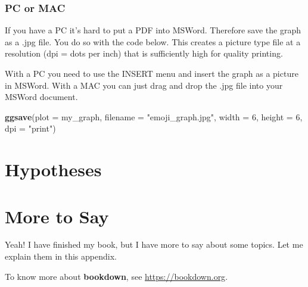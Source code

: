 \documentclass[
]{krantz}
\makeatletter
\newenvironment{Shaded}{\begin{snugshade}}{\end{snugshade}}
\newcommand{\DataTypeTok}[1]{\textcolor[rgb]{0.27,0.27,0.27}{#1}}
\newcommand{\DecValTok}[1]{\textcolor[rgb]{0.06,0.06,0.06}{#1}}
\newcommand{\KeywordTok}[1]{\textcolor[rgb]{0.27,0.27,0.27}{\textbf{#1}}}
\newcommand{\NormalTok}[1]{#1}
\newcommand{\StringTok}[1]{\textcolor[rgb]{0.5,0.5,0.5}{#1}}
\newenvironment{kframe}{%
\medskip{}
\setlength{\fboxsep}{.8em}
 \def\at@end@of@kframe{}%
 \ifinner\ifhmode%
  \def\at@end@of@kframe{\end{minipage}}%
  \begin{minipage}{\columnwidth}%
 \fi\fi%
 \def\FrameCommand##1{\hskip\@totalleftmargin \hskip-\fboxsep
 \colorbox{shadecolor}{##1}\hskip-\fboxsep
     \hskip-\linewidth \hskip-\@totalleftmargin \hskip\columnwidth}%
 \MakeFramed {\advance\hsize-\width
   \@totalleftmargin\z@ \linewidth\hsize
   \@setminipage}}%
 {\par\unskip\endMakeFramed%
 \at@end@of@kframe}
\renewenvironment{Shaded}{\begin{kframe}}{\end{kframe}}
\makeatother
\begin{document}
\hypertarget{pc-or-mac}{%
\subsection{PC or MAC}\label{pc-or-mac}}

If you have a PC it's hard to put a PDF into MSWord. Therefore save the graph as a .jpg file. You do so with the code below. This creates a picture type file at a resolution (dpi = dots per inch) that is sufficiently high for quality printing.

With a PC you need to use the INSERT menu and insert the graph as a picture in MSWord. With a MAC you can just drag and drop the .jpg file into your MSWord document.

\begin{Shaded}
\begin{Highlighting}[]
\KeywordTok{ggsave}\NormalTok{(}\DataTypeTok{plot =}\NormalTok{ my_graph, }
       \DataTypeTok{filename =} \StringTok{"emoji_graph.jpg"}\NormalTok{, }
       \DataTypeTok{width =} \DecValTok{6}\NormalTok{, }
       \DataTypeTok{height =} \DecValTok{6}\NormalTok{, }
       \DataTypeTok{dpi =} \StringTok{"print"}\NormalTok{)}
\end{Highlighting}
\end{Shaded}

\hypertarget{hypotheses}{%
\chapter{Hypotheses}\label{hypotheses}}

\cleardoublepage

\hypertarget{appendix-appendix}{%
\appendix {}}


\hypertarget{more-to-say}{%
\chapter{More to Say}\label{more-to-say}}

Yeah! I have finished my book, but I have more to say about some topics. Let me explain them in this appendix.

To know more about \textbf{bookdown}, see \url{https://bookdown.org}.

  

\backmatter
\printindex
\end{document}
